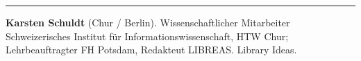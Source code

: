 \begin{center}\rule{0.5\linewidth}{\linethickness}\end{center}

\textbf{Karsten Schuldt} (Chur / Berlin). Wissenschaftlicher Mitarbeiter
Schweizerisches Institut für Informationswissenschaft, HTW Chur;
Lehrbeauftragter FH Potsdam, Redakteut LIBREAS. Library Ideas.
